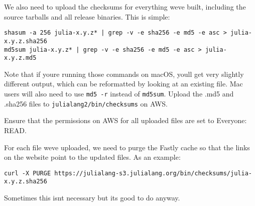 We also need to upload the checksums for everything we{\textquotesingle}ve built, including the source tarballs and all release binaries. This is simple:




\begin{lstlisting}
shasum -a 256 julia-x.y.z* | grep -v -e sha256 -e md5 -e asc > julia-x.y.z.sha256
md5sum julia-x.y.z* | grep -v -e sha256 -e md5 -e asc > julia-x.y.z.md5
\end{lstlisting}



Note that if you{\textquotesingle}re running those commands on macOS, you{\textquotesingle}ll get very slightly different output, which can be reformatted by looking at an existing file. Mac users will also need to use \texttt{md5 -r} instead of \texttt{md5sum}. Upload the .md5 and .sha256 files to \texttt{julialang2/bin/checksums} on AWS.



Ensure that the permissions on AWS for all uploaded files are set to {\textquotedbl}Everyone: READ.{\textquotedbl}



For each file we{\textquotesingle}ve uploaded, we need to purge the Fastly cache so that the links on the website point to the updated files. As an example:




\begin{lstlisting}
curl -X PURGE https://julialang-s3.julialang.org/bin/checksums/julia-x.y.z.sha256
\end{lstlisting}



Sometimes this isn{\textquotesingle}t necessary but it{\textquotesingle}s good to do anyway.
